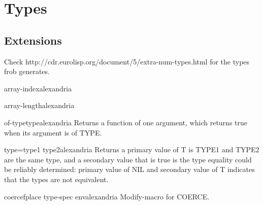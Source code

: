 
\chapter{Types}
\label{cha:types}

\section{Extensions}
\label{sec:extensions}

Check http://cdr.eurolisp.org/document/5/extra-num-types.html for the
types frob generates.

\begin{type}{array-index}{}{alexandria}{}
  
\end{type}

\begin{type}{array-length}{}{alexandria}{}
  
\end{type}

\begin{function}{of-type}{type}{alexandria}{}
  Returns a function of one argument, which returns true when its argument is
of TYPE.
\end{function}

\begin{function}{type=}{type1 type2}{alexandria}{}
  Returns a primary value of T is TYPE1 and TYPE2 are the same type,
and a secondary value that is true is the type equality could be reliably
determined: primary value of NIL and secondary value of T indicates that the
types are not equivalent.
\end{function}

\begin{macro}{coercef}{place type-spec \env env}{alexandria}{}
  Modify-macro for COERCE.
\end{macro}

